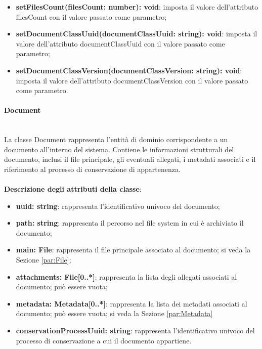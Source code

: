 \documentclass[a4paper,12pt]{article}
\begin{document}
{{{\begin{itemize}
                    \item \textbf{setFilesCount(filesCount: number): void}: imposta il valore dell'attributo filesCount con il valore passato come parametro;
                    \item \textbf{setDocumentClassUuid(documentClassUuid: string): void}: imposta il valore dell'attributo documentClassUuid con il valore passato come parametro;
                    \item \textbf{setDocumentClassVersion(documentClassVersion: string): void}: imposta il valore dell'attributo documentClassVersion con il valore passato come parametro.
                \end{itemize}
                \paragraph{Document}\label{par:Document}\mbox{}\\
                La classe Document rappresenta l'entità di dominio corrispondente a un documento all'interno del sistema. Contiene le informazioni strutturali del documento, inclusi il file principale, gli eventuali allegati, i metadati associati e il riferimento al processo di conservazione di appartenenza.\\
                \\
                \textbf{Descrizione degli attributi della classe}:
                \begin{itemize}
                    \item \textbf{uuid: string}: rappresenta l'identificativo univoco del documento;
                    \item \textbf{path: string}: rappresenta il percorso nel file system in cui è archiviato il documento;
                    \item \textbf{main: File}: rappresenta il file principale associato al documento; si veda la Sezione \ref{par:File};
                    \item \textbf{attachments: File[0..*]}: rappresenta la lista degli allegati associati al documento; può essere vuota;
                    \item \textbf{metadata: Metadata[0..*]}: rappresenta la lista dei metadati associati al documento; può essere vuota; si veda la Sezione \ref{par:Metadata}
                    \item \textbf{conservationProcessUuid: string}: rappresenta l'identificativo univoco del processo di conservazione a cui il documento appartiene.
                \end{itemize}
 
}}}
\end{document}
